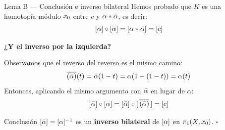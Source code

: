\begin{frame}{Lema B — Conclusión e inverso bilateral}
  Hemos probado que $K$ es una homotopía módulo $x_0$ entre $c$ y
  $\alpha * \bar{\alpha}$, es decir:
  \[
    [\alpha] \circ [\bar{\alpha}] = [\alpha * \bar{\alpha}] = [c]
  \]

  \bigskip
  \textbf{¿Y el inverso por la izquierda?}

  Observamos que el reverso del reverso es el mismo camino:
  \[
    \overline{(\bar{\alpha})}(t) = \bar{\alpha}(1-t) = \alpha(1-(1-t)) = \alpha(t)
  \]
  Entonces, aplicando el mismo argumento con $\bar{\alpha}$ en lugar de $\alpha$:
  \[
    [\bar{\alpha}] \circ [\alpha]
    = [\bar{\alpha}] \circ [\,\overline{(\bar{\alpha})}\,]
    = [c]
  \]

  \begin{block}{Conclusión}
    $[\bar{\alpha}] = [\alpha]^{-1}$ es un \textbf{inverso bilateral} de
    $[\alpha]$ en $\pi_1(X,x_0)$. \hfill $\square$
  \end{block}
\end{frame}
